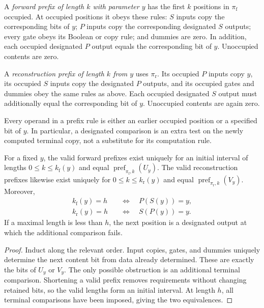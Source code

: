 \begin{definition}\label{macro:prefixes}
A \emph{forward prefix of length $k$ with parameter $y$} has the first
$k$ positions in $\pi_{\mathrm f}$ occupied.  At occupied positions it
obeys these rules: $S$ inputs copy the corresponding bits of $y$;
$P$ inputs copy the corresponding designated $S$ outputs; every gate
obeys its Boolean or copy rule; and dummies are zero.  In addition,
each occupied designated $P$ output equals the corresponding bit of
$y$.  Unoccupied contents are zero.

A \emph{reconstruction prefix of length $k$ from $y$} uses
$\pi_{\mathrm r}$.  Its occupied $P$ inputs copy $y$, its occupied
$S$ inputs copy the designated $P$ outputs, and its occupied gates
and dummies obey the same rules as above.  Each occupied designated
$S$ output must additionally equal the corresponding bit of $y$.
Unoccupied contents are again zero.
\end{definition}

Every operand in a prefix rule is either an earlier occupied position
or a specified bit of $y$.  In particular, a designated comparison is
an extra test on the newly computed terminal copy, not a substitute
for its computation rule.

\begin{lemma}
\label{macro:prefix-uniqueness}
For a fixed $y$, the valid forward prefixes exist uniquely for an
initial interval of lengths $0\le k\le k_{\mathrm f}(y)$ and equal
$\operatorname{pref}_{\pi_{\mathrm f},k}(U_y)$.  The valid
reconstruction prefixes likewise exist uniquely for
$0\le k\le k_{\mathrm r}(y)$ and equal
$\operatorname{pref}_{\pi_{\mathrm r},k}(V_y)$.  Moreover,
\begin{align}
 k_{\mathrm f}(y)=h&\quad\Longleftrightarrow\quad P(S(y))=y,
 \label{macro:forward-obstruction}\\
 k_{\mathrm r}(y)=h&\quad\Longleftrightarrow\quad S(P(y))=y.
 \label{macro:reverse-obstruction}
\end{align}
If a maximal length is less than $h$, the next position is a designated
output at which the additional comparison fails.
\end{lemma}

\begin{proof}
Induct along the relevant order.  Input copies, gates, and dummies
uniquely determine the next content bit from data already determined.
These are exactly the bits of $U_y$ or $V_y$.  The only possible
obstruction is an additional terminal comparison.  Shortening a valid
prefix removes requirements without changing retained bits, so the
valid lengths form an initial interval.  At length $h$, all terminal
comparisons have been imposed, giving the two equivalences.
\end{proof}

